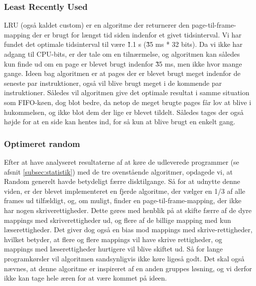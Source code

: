 	\subsubsection{Least Recently Used}
	LRU (også kaldet custom) er en algoritme der returnerer den page-til-frame-mapping der er brugt for længst tid siden indenfor et givet tidsinterval.  Vi har fundet det optimale tidsinterval til være \~1.1 s (\~35 ms * 32 bits). Da vi ikke har adgang til CPU-bits, er der tale om en tilnærmelse, og algoritmen kan således kun finde ud om en page er blevet brugt indenfor \~35 ms, men ikke hvor mange gange. Ideen bag algoritmen er at pages der er blevet brugt meget indenfor de seneste par instruktioner, også vil blive brugt meget i de kommende par instruktioner. Således vil algoritmen give det optimale resultat i samme situation som FIFO-køen, dog blot bedre, da netop de meget brugte pages får lov at blive i hukommelsen, og ikke blot dem der lige er blevet tildelt. Således tages der også højde for at en side kan hentes ind, for så kun at blive brugt en enkelt gang.

	\subsubsection{Optimeret random}
	Efter at have analyseret resultaterne af at køre de udleverede programmer (se afsnit \ref{subsec:statistik}) med de tre ovenstående algoritmer, opdagede vi, at Random generelt havde betydeligt færre disktilgange. Så for at udnytte denne viden, er der blevet implementeret en fjerde algoritme, der vælger en 1/3 af alle frames ud tilfældigt, og, om muligt, finder en page-til-frame-mapping, der ikke har nogen skriverettigheder. Dette gøres med henblik på at skifte færre af de dyre mappings med skriverettigheder ud, og flere af de billige mapping med kun læserettigheder. Det giver dog også en bias mod mappings med skrive-rettigheder, hvilket betyder, at flere og flere mappings vil have skrive rettigheder, og mappings med læserettigheder hurtigere vil blive skiftet ud. Så for lange programkørsler vil algoritmen sandsynligvis ikke køre ligeså godt. Det skal også nævnes, at denne algoritme er inspireret af en anden gruppes løsning, og vi derfor ikke kan tage hele æren for at være kommet på ideen.

